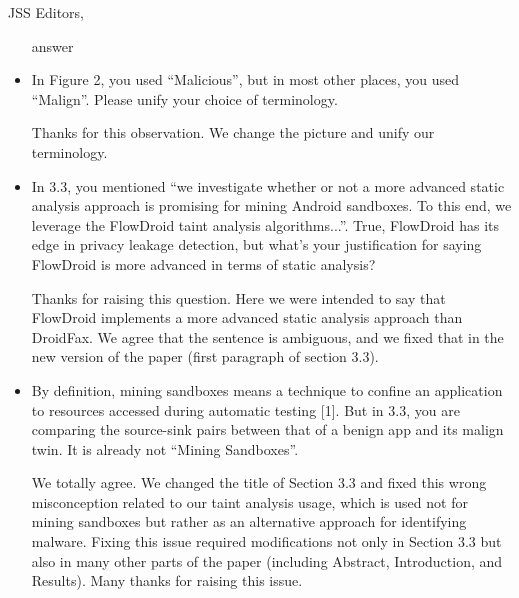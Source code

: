 \documentclass{letter}
\begin{document}
\begin{letter}{JSS Editors,}
\begin{itemize}
\vspace{0.2cm}

{\color{blue}{\bf Answer:} answer}

\vspace{0.2cm}

\item In Figure 2, you used ``Malicious'', but in most other places, you used ``Malign''. Please unify your choice of terminology.


\vspace{0.2cm}

{\color{blue}{\bf Answer:} Thanks for this observation. We change the picture and unify our terminology.}

\vspace{0.2cm}

\item In 3.3, you mentioned ``we investigate whether or not a more advanced static analysis approach is promising for mining 
Android sandboxes. To this end, we leverage the FlowDroid taint analysis algorithms...''. True, FlowDroid has its edge 
in privacy leakage detection, but what's your justification for saying FlowDroid is more advanced in terms of static analysis?


\vspace{0.2cm}

{\color{blue}{\bf Answer:} Thanks for raising this question. Here we were intended to say that FlowDroid implements a more advanced static analysis approach than DroidFax. We agree that the sentence is ambiguous, and we fixed that in the new version of the paper (first paragraph
  of section 3.3).}

\vspace{0.2cm}

\item By definition, mining sandboxes means a technique to confine an application to resources accessed during automatic 
testing [1]. But in 3.3, you are comparing the source-sink pairs between that of a benign app and its malign twin. It is already 
not ``Mining Sandboxes''.

\vspace{0.2cm}

{\color{blue}{\bf Answer.} We totally agree. We changed the title of Section 3.3 and fixed this wrong misconception related to our taint analysis usage, which is used not for mining sandboxes but rather as an alternative approach for identifying malware. Fixing this issue required modifications not only in Section 3.3 but also in many other parts of the paper (including Abstract, Introduction, and Results). Many thanks for raising this issue.}



\end{itemize}
\end{letter}
\end{document}
